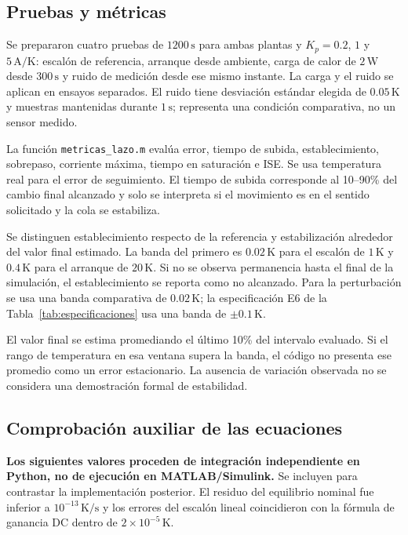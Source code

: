 \documentclass[journal,twocolumn]{IEEEtran}
\begin{document}
\subsection{Pruebas y métricas}
Se prepararon cuatro pruebas de $1200\,\mathrm s$ para ambas plantas y $K_p=0.2$, $1$ y $5\,\mathrm{A/K}$: escalón de referencia, arranque desde ambiente, carga de calor de $2\,\mathrm W$ desde $300\,\mathrm s$ y ruido de medición desde ese mismo instante. La carga y el ruido se aplican en ensayos separados. El ruido tiene desviación estándar elegida de $0.05\,\mathrm K$ y muestras mantenidas durante $1\,\mathrm s$; representa una condición comparativa, no un sensor medido.

La función \texttt{metricas\_lazo.m} evalúa error, tiempo de subida, establecimiento, sobrepaso, corriente máxima, tiempo en saturación e ISE. Se usa temperatura real para el error de seguimiento. El tiempo de subida corresponde al 10--90\% del cambio final alcanzado y solo se interpreta si el movimiento es en el sentido solicitado y la cola se estabiliza.

Se distinguen establecimiento respecto de la referencia y estabilización alrededor del valor final estimado. La banda del primero es $0.02\,\mathrm K$ para el escalón de $1\,\mathrm K$ y $0.4\,\mathrm K$ para el arranque de $20\,\mathrm K$. Si no se observa permanencia hasta el final de la simulación, el establecimiento se reporta como no alcanzado. Para la perturbación se usa una banda comparativa de $0.02\,\mathrm K$; la especificación E6 de la Tabla~\ref{tab:especificaciones} usa una banda de $\pm0.1\,\mathrm K$.

El valor final se estima promediando el último 10\% del intervalo evaluado. Si el rango de temperatura en esa ventana supera la banda, el código no presenta ese promedio como un error estacionario. La ausencia de variación observada no se considera una demostración formal de estabilidad.

\subsection{Comprobación auxiliar de las ecuaciones}
\textbf{Los siguientes valores proceden de integración independiente en Python, no de ejecución en MATLAB/Simulink.} Se incluyen para contrastar la implementación posterior. El residuo del equilibrio nominal fue inferior a $10^{-13}\,\mathrm{K/s}$ y los errores del escalón lineal coincidieron con la fórmula de ganancia DC dentro de $2\times10^{-5}\,\mathrm K$.
\end{document}
